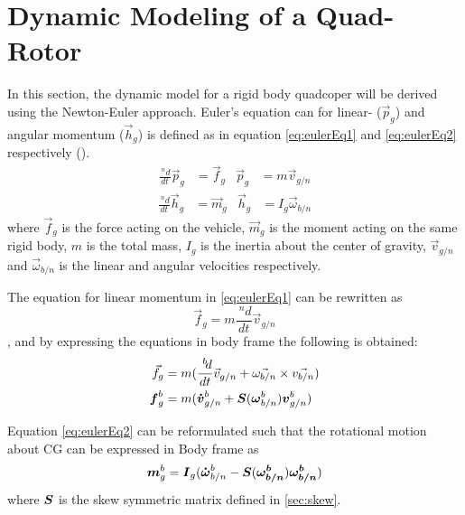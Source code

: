 \section{Dynamic Modeling of a Quad-Rotor}\label{sec:dynMod}
In this section, the dynamic model for a rigid body quadcoper will be derived using the Newton-Euler approach. Euler's equation can for linear- ($\vec{p}_g$) and angular momentum ($\vec{h}_g$) is 
defined as in equation \ref{eq:eulerEq1} and \ref{eq:eulerEq2} respectively (\cite{Fossen2011}).
\begin{align}\label{eq:eulerEq1}
  \frac{~^n\!d}{dt}\vec{p}_{g}&=\vec{f}_{g} & \vec{p}_{g}&=m\vec{v}_{g/n}
\end{align}
\begin{align}\label{eq:eulerEq2}
  \frac{~^n\!d}{dt}\vec{h}_{g}&=\vec{m}_{g} & \vec{h}_{g}&=I_{g}\vec{\omega}_{b/n}
\end{align}
where $\vec{f}_{g}$ is the force acting on the vehicle, $\vec{m}_g$ is the moment acting on the same rigid body, $m$ is the total mass, $I_g$ is the inertia about the center of gravity, $\vec{v}_{g/n}$
and $\vec{\omega}_{b/n}$ is the linear and angular velocities respectively.

The equation for linear momentum in \ref{eq:eulerEq1} can be rewritten as
\begin{equation}
  \vec{f}_{g}=m\frac{~^n\!d}{dt}\vec{v}_{g/n}
\end{equation}
, and by expressing the equations in body frame the following is obtained:
\begin{align}
  \vec{f}_{g}&=m(\frac{~^b\!d}{dt}\vec{v}_{g/n}+\vec{\omega_{b/n}}\times\vec{v_{b/n}})\\
  \boldsymbol{f}_{g}^{b}&=m(\boldsymbol{\dot{v}}_{g/n}^{b}+\boldsymbol{S}(\boldsymbol{\omega}_{b/n}^{b})\boldsymbol{v}_{g/n}^{b}) \label{eq:linMot}
\end{align}

Equation \ref{eq:eulerEq2} can be reformulated such that the rotational motion about CG can be expressed in Body frame as
\begin{equation}\label{eq:rotMot}
  \boldsymbol{m}_{g}^{b}=\boldsymbol{I}_g(\boldsymbol{\dot{\omega}}_{b/n}^{b}-\boldsymbol{S}(\boldsymbol{\omega_{b/n}^{b}})\boldsymbol{\omega_{b/n}^{b}})
\end{equation}
where $\boldsymbol{S}$ is the skew symmetric matrix defined in \ref{sec:skew}.

